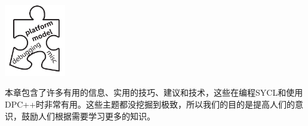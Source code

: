 \begin{center}
	\includegraphics[width=0.2\textwidth]{content/chapter-13/images/1}
\end{center}

本章包含了许多有用的信息、实用的技巧、建议和技术，这些在编程SYCL和使用DPC++时非常有用。这些主题都没挖掘到极致，所以我们的目的是提高人们的意识，鼓励人们根据需要学习更多的知识。\par